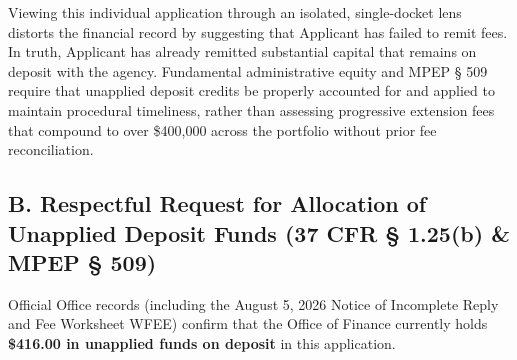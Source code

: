 \documentclass[11pt,letterpaper]{article}
\begin{document}
Viewing this individual application through an isolated, single-docket lens distorts the financial record by suggesting that Applicant has failed to remit fees. In truth, Applicant has already remitted substantial capital that remains on deposit with the agency. Fundamental administrative equity and MPEP \S{} 509 require that unapplied deposit credits be properly accounted for and applied to maintain procedural timeliness, rather than assessing progressive extension fees that compound to over \$400,000 across the portfolio without prior fee reconciliation.

\subsection*{B. Respectful Request for Allocation of Unapplied Deposit Funds (37 CFR \S{} 1.25(b) \& MPEP \S{} 509)}
Official Office records (including the August 5, 2026 Notice of Incomplete Reply and Fee Worksheet WFEE) confirm that the Office of Finance currently holds \textbf{\$416.00 in unapplied funds on deposit} in this application.
\end{document}
